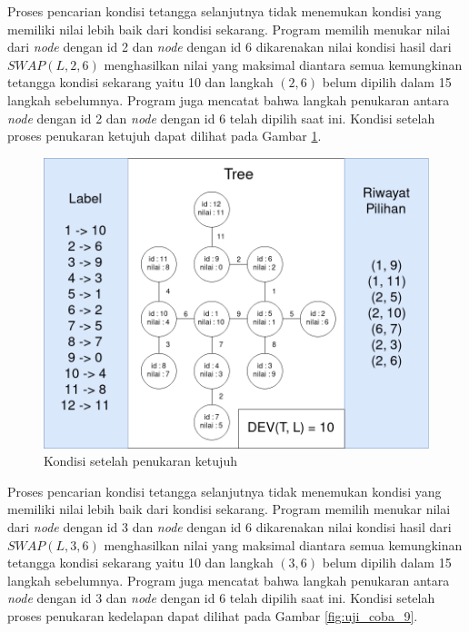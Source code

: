 Proses pencarian kondisi tetangga selanjutnya tidak menemukan kondisi yang memiliki nilai lebih baik dari kondisi sekarang. Program memilih menukar nilai dari \textit{node} dengan id 2 dan \textit{node} dengan id 6 dikarenakan nilai kondisi hasil dari $ SWAP(L, 2, 6) $ menghasilkan nilai yang maksimal diantara semua kemungkinan tetangga kondisi sekarang yaitu 10 dan langkah $ (2,6) $ belum dipilih dalam 15 langkah sebelumnya. Program juga mencatat bahwa langkah penukaran antara \textit{node} dengan id 2 dan \textit{node} dengan id 6 telah dipilih saat ini. Kondisi setelah proses penukaran ketujuh dapat dilihat pada Gambar \ref{fig:uji_coba_8}.

\begin{figure}[ht]
	\centering\includegraphics[width=1\textwidth]{bab5/figures/uji_coba_8.png}
	\caption{Kondisi setelah penukaran ketujuh}
	\label{fig:uji_coba_8}
\end{figure}

Proses pencarian kondisi tetangga selanjutnya tidak menemukan kondisi yang memiliki nilai lebih baik dari kondisi sekarang. Program memilih menukar nilai dari \textit{node} dengan id 3 dan \textit{node} dengan id 6 dikarenakan nilai kondisi hasil dari $ SWAP(L, 3, 6) $ menghasilkan nilai yang maksimal diantara semua kemungkinan tetangga kondisi sekarang yaitu 10 dan langkah $ (3,6) $ belum dipilih dalam 15 langkah sebelumnya. Program juga mencatat bahwa langkah penukaran antara \textit{node} dengan id 3 dan \textit{node} dengan id 6 telah dipilih saat ini. Kondisi setelah proses penukaran kedelapan dapat dilihat pada Gambar \ref{fig:uji_coba_9}.

